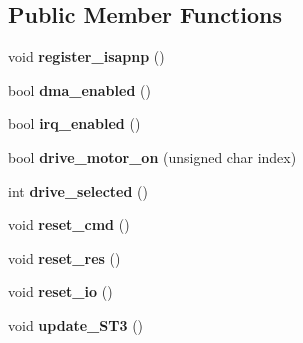\subsection*{Public Member Functions}
\begin{DoxyCompactItemize}
\item 
\hypertarget{classFloppyController_ae1ec5aecdbb6827820d71c1aa3c8c6ea}{void {\bfseries register\-\_\-isapnp} ()}\label{classFloppyController_ae1ec5aecdbb6827820d71c1aa3c8c6ea}

\item 
\hypertarget{classFloppyController_adfd8db7dad682bb4c22450c8fa4ad519}{bool {\bfseries dma\-\_\-enabled} ()}\label{classFloppyController_adfd8db7dad682bb4c22450c8fa4ad519}

\item 
\hypertarget{classFloppyController_a6df8fcbafb605ef8763d7a6c5e98b586}{bool {\bfseries irq\-\_\-enabled} ()}\label{classFloppyController_a6df8fcbafb605ef8763d7a6c5e98b586}

\item 
\hypertarget{classFloppyController_abf1dea8401d35c4bb492e6e5fe6b8de8}{bool {\bfseries drive\-\_\-motor\-\_\-on} (unsigned char index)}\label{classFloppyController_abf1dea8401d35c4bb492e6e5fe6b8de8}

\item 
\hypertarget{classFloppyController_a060c236b8fc3646559fbaec26138f7d2}{int {\bfseries drive\-\_\-selected} ()}\label{classFloppyController_a060c236b8fc3646559fbaec26138f7d2}

\item 
\hypertarget{classFloppyController_a77a9c2f03d6f823258dc21425be2bbf0}{void {\bfseries reset\-\_\-cmd} ()}\label{classFloppyController_a77a9c2f03d6f823258dc21425be2bbf0}

\item 
\hypertarget{classFloppyController_a86d00f09b49a11f32b659893f29ec4bf}{void {\bfseries reset\-\_\-res} ()}\label{classFloppyController_a86d00f09b49a11f32b659893f29ec4bf}

\item 
\hypertarget{classFloppyController_a1a8b406643b99f91479993963c65efd2}{void {\bfseries reset\-\_\-io} ()}\label{classFloppyController_a1a8b406643b99f91479993963c65efd2}

\item 
\hypertarget{classFloppyController_a72b59cb487b088ab236701a74e3f223e}{void {\bfseries update\-\_\-\-S\-T3} ()}\label{classFloppyController_a72b59cb487b088ab236701a74e3f223e}


\end{DoxyCompactItemize}
